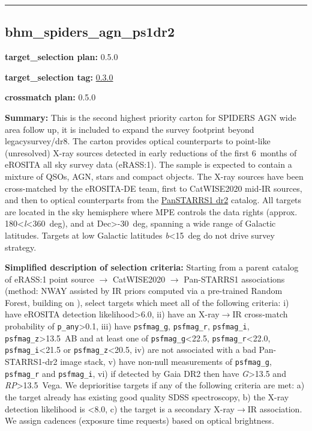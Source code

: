 \begin{center}\rule{0.5\linewidth}{0.5pt}\end{center}

\hypertarget{bhm_spiders_agn_ps1dr2_plan0.5.0}{%
\subsection{bhm\_spiders\_agn\_ps1dr2}\label{bhm_spiders_agn_ps1dr2_plan0.5.0}}

\noindent\textbf{target\_selection plan:} 0.5.0

\noindent\textbf{target\_selection tag:}
\href{https://github.com/sdss/target_selection/tree/0.3.0/}{0.3.0}

\noindent\textbf{crossmatch plan:} 0.5.0

\noindent\textbf{Summary:} This is the second highest priority carton for SPIDERS
AGN wide area follow up, it is included to expand the survey footprint
beyond legacysurvey/dr8. The carton provides optical counterparts to
point-like (unresolved) X-ray sources detected in early reductions of
the first 6~months of eROSITA all sky survey data (eRASS:1). The sample
is expected to contain a mixture of QSOs, AGN, stars and compact
objects. The X-ray sources have been cross-matched by the eROSITA-DE
team, first to
CatWISE2020 \citep{Marocco2021}
mid-IR sources, and then to optical counterparts from the
\href{https://outerspace.stsci.edu/display/PANSTARRS/}{PanSTARRS1 dr2}
catalog. All targets are located in the sky hemisphere where MPE
controls the data rights (approx.
180\textless{}\emph{l}\textless360~deg), and at Dec\textgreater-30~deg,
spanning a wide range of Galactic latitudes. Targets at low Galactic
latitudes \textbar{}\emph{b}\textbar\textless15~deg do not drive survey
strategy.

\noindent\textbf{Simplified description of selection criteria:} Starting from a
parent catalog of eRASS:1 point source $\rightarrow$ CatWISE2020 $\rightarrow$ Pan-STARRS1
associations (method: NWAY assisted by IR priors computed via a
pre-trained Random Forest, building on
\citealt{Salvato2022}), select targets which meet all of the following criteria:
i) have eROSITA detection likelihood\textgreater6.0, ii) have an
X-ray$\rightarrow$IR cross-match probability of \texttt{p\_any}\textgreater0.1, iii)
have \texttt{psfmag\_g}, \texttt{psfmag\_r}, \texttt{psfmag\_i},
\texttt{psfmag\_z}\textgreater13.5~AB and at least one of
\texttt{psfmag\_g}\textless22.5, \texttt{psfmag\_r}\textless22.0,
\texttt{psfmag\_i}\textless21.5 or \texttt{psfmag\_z}\textless20.5, iv)
are not associated with a bad Pan-STARRS1-dr2 image stack, v) have
non-null measurements of \texttt{psfmag\_g}, \texttt{psfmag\_r} and
\texttt{psfmag\_i}, vi) if detected by Gaia DR2 then have
\emph{G}\textgreater13.5 and \emph{RP}\textgreater13.5~Vega. We
deprioritise targets if any of the following criteria are met: a) the
target already has existing good quality SDSS spectroscopy, b) the X-ray
detection likelihood is \textless8.0, c) the target is a secondary
X-ray$\rightarrow$IR association. We assign cadences (exposure time requests) based
on optical brightness.


